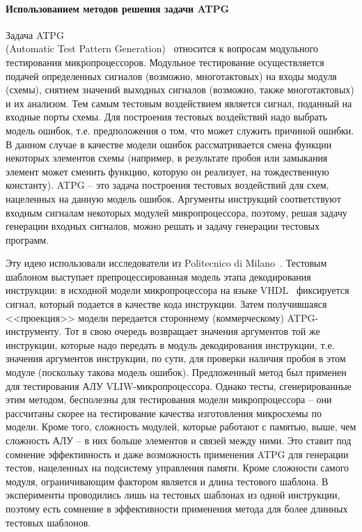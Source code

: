 \paragraph{Использованием методов решения задачи ATPG}

Задача ATPG\\(Automatic Test Pattern Generation)~\cite{ATPGbook} относится к вопросам модульного тестирования микропроцессоров. Модульное тестирование осуществляется подачей определенных сигналов (возможно, многотактовых) на входы модуля (схемы), снятием значений выходных сигналов (возможно, также многотактовых) и их анализом. Тем самым тестовым воздействием является сигнал, поданный на входные порты схемы. Для построения тестовых воздействий надо выбрать модель ошибок, т.е. предположения о том, что может служить причиной ошибки. В данном случае в качестве модели ошибок рассматривается смена функции некоторых элементов схемы (например, в результате пробоя или замыкания элемент может сменить функцию, которую он реализует, на тождественную константу). ATPG -- это задача построения тестовых воздействий для схем, нацеленных на данную модель ошибок. Аргументы инструкций соответствуют входным сигналам некоторых модулей микропроцессора, поэтому, решая задачу генерации входных сигналов, можно решать и задачу генерации тестовых программ.

Эту идею использовали исследователи из Politecnico di Milano~\cite{toATPG}. Тестовым шаблоном выступает препроцессированная модель этапа декодирования инструкции: в исходной модели микропроцессора на языке VHDL~\cite{VHDL} фиксируется сигнал, который подается в качестве кода инструкции. Затем получившаяся <<проекция>> модели передается стороннему (коммерческому) ATPG-инструменту. Тот в свою очередь возвращает значения аргументов той же инструкции, которые надо передать в модуль декодирования инструкции, т.е. значения аргументов инструкции, по сути, для проверки наличия пробоя в этом модуле (поскольку такова модель ошибок). Предложенный метод был применен для тестирования АЛУ VLIW-микропроцессора. Однако тесты, сгенерированные этим методом, бесполезны для тестирования модели микропроцессора -- они рассчитаны скорее на тестирование качества изготовления микросхемы по модели. Кроме того, сложность модулей, которые работают с памятью, выше, чем сложность АЛУ -- в них больше элементов и связей между ними. Это ставит под сомнение эффективность и даже возможность применения ATPG для генерации тестов, нацеленных на подсистему управления памяти. Кроме сложности самого модуля, ограничивающим фактором является и длина тестового шаблона. В~\cite{toATPG} эксперименты проводились лишь на тестовых шаблонах из одной инструкции, поэтому есть сомнение в эффективности применения метода для более длинных тестовых шаблонов.



